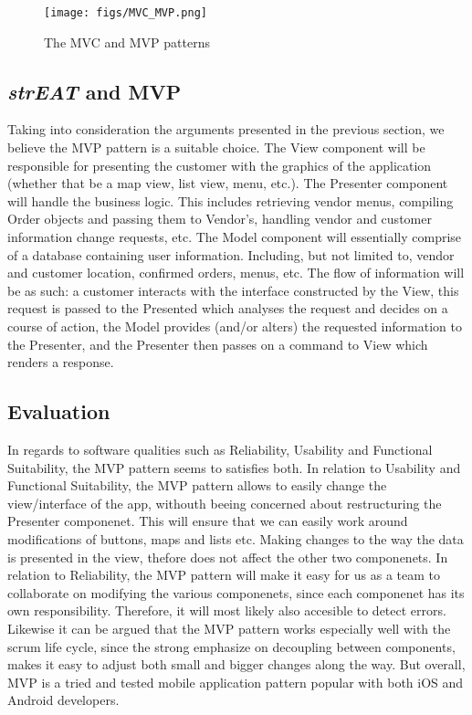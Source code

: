 \begin{figure}[h!]
  \centering
  \texttt{[image: figs/MVC\_MVP.png]}
  \caption{The MVC and MVP patterns \cite{Vasiliy}}
  \label{MVC_MVP}
\end{figure}

\subsection{\textit{strEAT} and MVP}
Taking into consideration the arguments presented in the previous section, we believe the MVP pattern is a suitable choice. The View component will be responsible for presenting the customer with the graphics of the application (whether that be a map view, list view, menu, etc.). The Presenter component will handle the business logic. This includes retrieving vendor menus, compiling Order objects and passing them to Vendor's, handling vendor and customer information change requests, etc. The Model component will essentially comprise of a database containing user information. Including, but not limited to, vendor and customer location, confirmed orders, menus, etc. The flow of information will be as such: a customer interacts with the interface constructed by the View, this request is passed to the Presented which analyses the request and decides on a course of action, the Model provides (and/or alters) the requested information to the Presenter, and the Presenter then passes on a command to View which renders a response.

\subsection{Evaluation}
In regards to software qualities such as Reliability, Usability and Functional Suitability, the MVP pattern seems to satisfies both. In relation to Usability and Functional Suitability, the MVP pattern allows to easily change the view/interface of the app, withouth beeing concerned about restructuring the Presenter componenet. This will ensure that we can easily work around modifications of buttons, maps and lists etc. Making changes to the way the data is presented in the view, thefore does not affect the other two componenets. In relation to Reliability, the MVP pattern will make it easy for us as a team to collaborate on modifying the various componenets, since each componenet has its own responsibility. Therefore, it will most likely also accesible to detect errors.
Likewise it can be argued that the MVP pattern works especially well with the scrum life cycle, since the strong emphasize on decoupling between components, makes it easy to adjust both small and bigger changes along the way. But overall, MVP is a tried and tested mobile application pattern popular with both iOS and Android developers.
